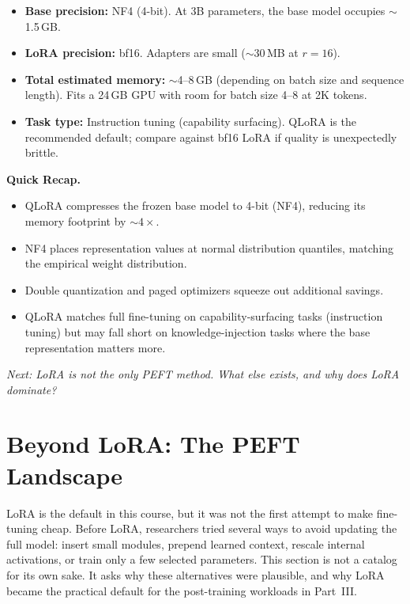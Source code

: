 \begin{tcolorbox}[colback=orange!5, colframe=orange!60, title=\textbf{For Project~3: QLoRA Setup}]
\begin{itemize}[nosep]
  \item \textbf{Base precision:} NF4 (4-bit). At 3B parameters, the base model occupies $\sim$1.5\,GB.
  \item \textbf{LoRA precision:} bf16. Adapters are small ($\sim$30\,MB at $r = 16$).
  \item \textbf{Total estimated memory:} $\sim$4--8\,GB (depending on batch size and sequence length). Fits a 24\,GB GPU with room for batch size 4--8 at 2K tokens.
  \item \textbf{Task type:} Instruction tuning (capability surfacing). QLoRA is the recommended default; compare against bf16 LoRA if quality is unexpectedly brittle.
\end{itemize}
\end{tcolorbox}

\begin{quickrecap}
\textbf{Quick Recap.}
\begin{itemize}[nosep,leftmargin=1.5em]
  \item QLoRA compresses the frozen base model to 4-bit (NF4), reducing its memory footprint by $\sim$$4\times$.
  \item NF4 places representation values at normal distribution quantiles, matching the empirical weight distribution.
  \item Double quantization and paged optimizers squeeze out additional savings.
  \item QLoRA matches full fine-tuning on capability-surfacing tasks (instruction tuning) but may fall short on knowledge-injection tasks where the base representation matters more.
\end{itemize}
\textit{Next: LoRA is not the only PEFT method. What else exists, and why does LoRA dominate?}
\end{quickrecap}


\section{Beyond LoRA: The PEFT Landscape}
\label{sec:other-peft}

LoRA is the default in this course, but it was not the first attempt to make fine-tuning cheap. Before LoRA, researchers tried several ways to avoid updating the full model: insert small modules, prepend learned context, rescale internal activations, or train only a few selected parameters. This section is not a catalog for its own sake. It asks why these alternatives were plausible, and why LoRA became the practical default for the post-training workloads in Part~III.


